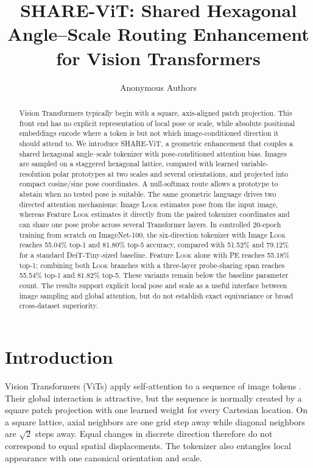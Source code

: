 \documentclass[10pt]{article}
\title{SHARE-ViT: Shared Hexagonal Angle--Scale Routing Enhancement\\
for Vision Transformers}
\author{Anonymous Authors}
\date{}
\newcommand{\method}{SHARE-ViT}
\newcommand{\look}{\textsc{Look}}
\begin{document}
\maketitle

\begin{abstract}
Vision Transformers typically begin with a square, axis-aligned patch
projection. This front end has no explicit representation of local pose or
scale, while absolute positional embeddings encode where a token is but not
which image-conditioned direction it should attend to. We introduce
\method{}, a geometric enhancement that couples a shared hexagonal angle--scale
tokenizer with pose-conditioned attention bias. Images are sampled on a
staggered hexagonal lattice, compared with learned variable-resolution polar
prototypes at two scales and several orientations, and projected into compact
cosine/sine pose coordinates. A null-softmax route allows a prototype to
abstain when no tested pose is suitable. The same geometric language drives two
directed attention mechanisms: Image \look{} estimates pose from the input
image, whereas Feature \look{} estimates it directly from the paired tokenizer
coordinates and can share one pose probe across several Transformer layers.
In controlled 20-epoch training from scratch on ImageNet-100, the
six-direction tokenizer with Image \look{} reaches 55.04\% top-1 and 81.80\%
top-5 accuracy, compared with 51.52\% and 79.12\% for a standard
DeiT-Tiny-sized baseline. Feature \look{} alone with PE reaches 55.18\% top-1;
combining both \look{} branches with a three-layer probe-sharing span reaches
55.54\% top-1 and 81.82\% top-5. These variants remain below the baseline
parameter count. The results support explicit local pose and scale as a useful
interface between image sampling and global attention, but do not establish
exact equivariance or broad cross-dataset superiority.
\end{abstract}

\section{Introduction}

Vision Transformers (ViTs) apply self-attention to a sequence of image tokens
\citep{dosovitskiy2021vit,touvron2021deit}. Their global interaction is
attractive, but the sequence is normally created by a square patch projection
with one learned weight for every Cartesian location. On a square lattice,
axial neighbors are one grid step away while diagonal neighbors are
$\sqrt{2}$ steps away. Equal changes in discrete direction therefore do not
correspond to equal spatial displacements. The tokenizer also entangles local
appearance with one canonical orientation and scale.
\end{document}
